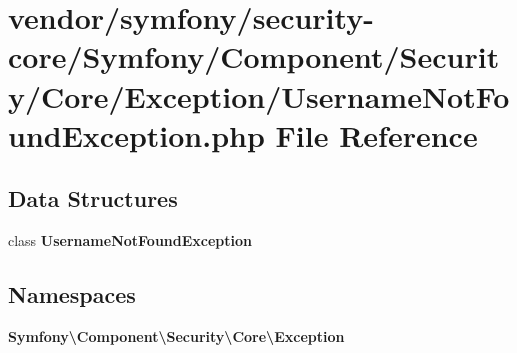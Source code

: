 \section{vendor/symfony/security-\/core/\+Symfony/\+Component/\+Security/\+Core/\+Exception/\+Username\+Not\+Found\+Exception.php File Reference}
\label{_username_not_found_exception_8php}
\subsection*{Data Structures}
\begin{DoxyCompactItemize}
\item 
class {\bf Username\+Not\+Found\+Exception}
\end{DoxyCompactItemize}
\subsection*{Namespaces}
\begin{DoxyCompactItemize}
\item 
 {\bf Symfony\textbackslash{}\+Component\textbackslash{}\+Security\textbackslash{}\+Core\textbackslash{}\+Exception}
\end{DoxyCompactItemize}
